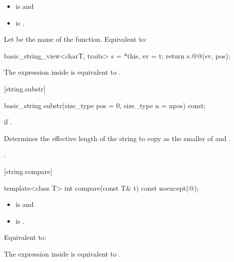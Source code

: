 \begin{itemdescr}
\pnum
\constraints
\begin{itemize}
\item
{} is
 and
\item
{} is
.
\end{itemize}

\pnum
\effects
Let  be the name of the function.
Equivalent to:
\begin{codeblock}
basic_string_view<charT, traits> s = *this, sv = t;
return s.@@(sv, pos);
\end{codeblock}

\pnum
\remarks
The expression inside  is equivalent to
.
\end{itemdescr}

[string.substr]{}

%
\begin{itemdecl}
basic_string substr(size_type pos = 0, size_type n = npos) const;
\end{itemdecl}

\begin{itemdescr}
\pnum
\throws
{}
if
.

\pnum
\effects
Determines the effective length  of the string to copy as the smaller of  and
.

\pnum
\returns
{}.
\end{itemdescr}

[string.compare]{}

%
\begin{itemdecl}
template<class T>
  int compare(const T& t) const noexcept(@\seebelow@);
\end{itemdecl}

\begin{itemdescr}
\pnum
\constraints
\begin{itemize}
\item
{} is
 and
\item
{} is
.
\end{itemize}

\pnum
\effects
Equivalent to: 

\pnum
\remarks
The expression inside  is equivalent to
.
\end{itemdescr}

